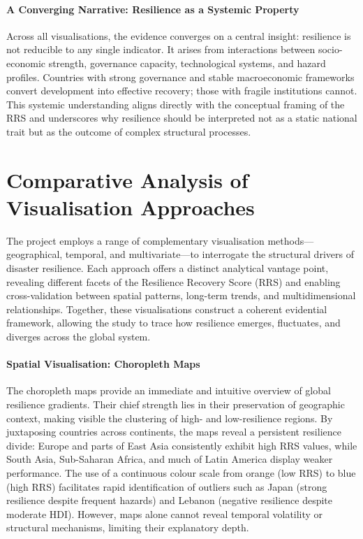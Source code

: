 \documentclass[conference]{IEEEtran}
\begin{document}
\paragraph{A Converging Narrative: Resilience as a Systemic Property}
Across all visualisations, the evidence converges on a central insight: resilience is not reducible to any single indicator. It arises from interactions between socio-economic strength, governance capacity, technological systems, and hazard profiles. Countries with strong governance and stable macroeconomic frameworks convert development into effective recovery; those with fragile institutions cannot. This systemic understanding aligns directly with the conceptual framing of the RRS and underscores why resilience should be interpreted not as a static national trait but as the outcome of complex structural processes.

\section{Comparative Analysis of Visualisation Approaches}
\noindent
The project employs a range of complementary visualisation methods—geographical, temporal, and multivariate—to interrogate the structural drivers of disaster resilience. Each approach offers a distinct analytical vantage point, revealing different facets of the Resilience Recovery Score (RRS) and enabling cross-validation between spatial patterns, long-term trends, and multidimensional relationships. Together, these visualisations construct a coherent evidential framework, allowing the study to trace how resilience emerges, fluctuates, and diverges across the global system.

\paragraph{Spatial Visualisation: Choropleth Maps}
The choropleth maps provide an immediate and intuitive overview of global resilience gradients. Their chief strength lies in their preservation of geographic context, making visible the clustering of high- and low-resilience regions. By juxtaposing countries across continents, the maps reveal a persistent resilience divide: Europe and parts of East Asia consistently exhibit high RRS values, while South Asia, Sub-Saharan Africa, and much of Latin America display weaker performance. The use of a continuous colour scale from orange (low RRS) to blue (high RRS) facilitates rapid identification of outliers such as Japan (strong resilience despite frequent hazards) and Lebanon (negative resilience despite moderate HDI). However, maps alone cannot reveal temporal volatility or structural mechanisms, limiting their explanatory depth.
\end{document}
